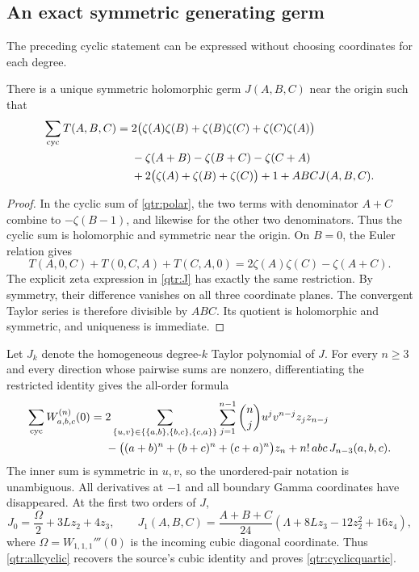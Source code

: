 \subsection{An exact symmetric generating germ}

The preceding cyclic statement can be expressed without
choosing coordinates for each degree.

\begin{proposition}\label{qtr:factorization}
There is a unique symmetric holomorphic germ \(J(A,B,C)\)
near the origin such that
\begin{align}
 \sum_{\mathrm{cyc}}T(A,B,C)
 ={}&2\bigl(\zeta(A)\zeta(B)+\zeta(B)\zeta(C)
                              +\zeta(C)\zeta(A)\bigr)\notag\\
 &-\zeta(A+B)-\zeta(B+C)-\zeta(C+A)\notag\\
 &+2\bigl(\zeta(A)+\zeta(B)+\zeta(C)\bigr)+1
 +ABC J(A,B,C).
 \label{qtr:J}
\end{align}
\end{proposition}

\begin{proof}
In the cyclic sum of \eqref{qtr:polar}, the two terms with
denominator \(A+C\) combine to \(-\zeta(B-1)\), and likewise
for the other two denominators. Thus the cyclic sum is
holomorphic and symmetric near the origin.
On \(B=0\), the Euler relation gives
\[
 T(A,0,C)+T(0,C,A)+T(C,A,0)
                   =2\zeta(A)\zeta(C)-\zeta(A+C).
\]
The explicit zeta expression in \eqref{qtr:J} has exactly the
same restriction. By symmetry, their difference vanishes on
all three coordinate planes. The convergent Taylor series is
therefore divisible by \(ABC\). Its quotient is holomorphic
and symmetric, and uniqueness is immediate.
\end{proof}

Let \(J_k\) denote the homogeneous degree-\(k\) Taylor
polynomial of \(J\). For every \(n\ge3\) and every direction
whose pairwise sums are nonzero, differentiating the restricted
identity gives the all-order formula
\begin{align}
 \sum_{\mathrm{cyc}}W_{a,b,c}^{(n)}(0)
 ={}&2\sum_{\{u,v\}\in\{\{a,b\},\{b,c\},\{c,a\}\}}
       \sum_{j=1}^{n-1}\binom nj u^jv^{n-j}z_jz_{n-j}\notag\\
 &-\bigl((a+b)^n+(b+c)^n+(c+a)^n\bigr)z_n
 +n!\,abc\,J_{n-3}(a,b,c).
 \label{qtr:allcyclic}
\end{align}
The inner sum is symmetric in \(u,v\), so the unordered-pair
notation is unambiguous. All derivatives at \(-1\) and all
boundary Gamma coordinates have disappeared. At the first
two orders of \(J\),
\[
 J_0=\frac{\Omega}{2}+3Lz_2+4z_3,\qquad
 J_1(A,B,C)=\frac{A+B+C}{24}
                  (\Lambda+8Lz_3-12z_2^2+16z_4),
\]
where \(\Omega=W_{1,1,1}'''(0)\) is the incoming cubic
diagonal coordinate. Thus \eqref{qtr:allcyclic} recovers the
source's cubic identity and proves
\eqref{qtr:cyclicquartic}.

